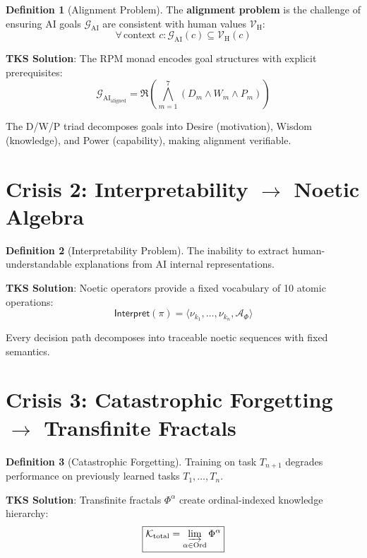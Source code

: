 \documentclass[11pt,twoside]{book}
\theoremstyle{definition}
\newtheorem{definition}{Definition}[chapter]
\theoremstyle{plain}
\theoremstyle{remark}
\newcommand{\noe}[1]{\nu_{#1}}
\newcommand{\TransFrac}[1]{\Phi^{#1}}
\newcommand{\RPM}{\mathfrak{R}}
\newcommand{\FractalAttractor}{\mathcal{A}_\Phi}
\newcommand{\AIGoal}{\mathcal{G}_{\mathrm{AI}}}
\newcommand{\HumanValue}{\mathcal{V}_{\mathrm{H}}}
\newcommand{\Interpret}{\mathsf{Interpret}}
\begin{document}
\begin{definition}[Alignment Problem]
The \textbf{alignment problem} is the challenge of ensuring AI goals $\AIGoal$ are consistent with human values $\HumanValue$:
\[
    \forall\, \text{context } c : \AIGoal(c) \subseteq \HumanValue(c)
\]
\end{definition}

\textbf{TKS Solution}: The RPM monad encodes goal structures with explicit prerequisites:
\begin{equation}
\boxed{
    \AIGoal_{\mathrm{aligned}} = \RPM\left(\bigwedge_{m=1}^{7} (D_m \wedge W_m \wedge P_m)\right)
}
\end{equation}

The D/W/P triad decomposes goals into Desire (motivation), Wisdom (knowledge), and Power (capability), making alignment verifiable.

\section{Crisis 2: Interpretability $\to$ Noetic Algebra}

\begin{definition}[Interpretability Problem]
The inability to extract human-understandable explanations from AI internal representations.
\end{definition}

\textbf{TKS Solution}: Noetic operators provide a fixed vocabulary of 10 atomic operations:
\begin{equation}
\boxed{
    \Interpret(\pi) = \langle \noe{k_1}, \ldots, \noe{k_n}, \FractalAttractor \rangle
}
\end{equation}

Every decision path decomposes into traceable noetic sequences with fixed semantics.

\section{Crisis 3: Catastrophic Forgetting $\to$ Transfinite Fractals}

\begin{definition}[Catastrophic Forgetting]
Training on task $T_{n+1}$ degrades performance on previously learned tasks $T_1, \ldots, T_n$.
\end{definition}

\textbf{TKS Solution}: Transfinite fractals $\TransFrac{\alpha}$ create ordinal-indexed knowledge hierarchy:
\begin{equation}
\boxed{
    \mathcal{K}_{\mathrm{total}} = \varinjlim_{\alpha \in \mathrm{Ord}} \TransFrac{\alpha}
}
\end{equation}
\end{document}
